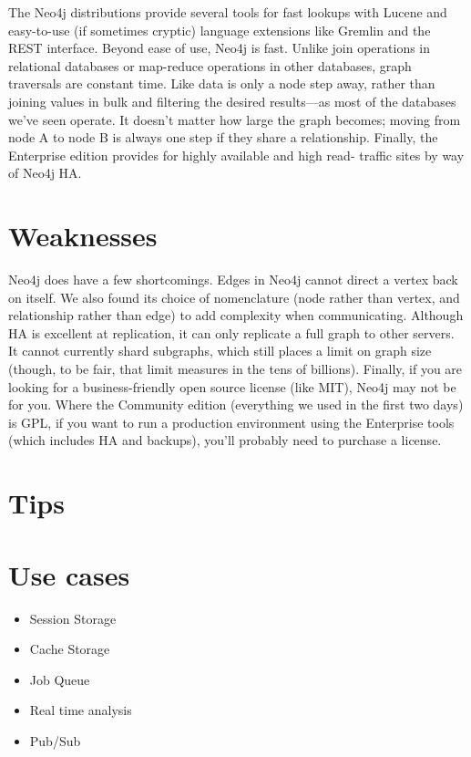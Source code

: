 The Neo4j distributions provide several tools for fast lookups with Lucene and easy-to-use (if sometimes cryptic) language extensions like Gremlin and the REST interface. Beyond ease of use, Neo4j is fast. Unlike join operations in relational databases or map-reduce operations in other databases, graph traversals are constant time. Like data is only a node step away, rather than joining values in bulk and filtering the desired results—as most of the databases we’ve seen operate. It doesn’t matter how large the graph becomes; moving from node A to node B is always one step if they share a relationship. Finally, the Enterprise edition provides for highly available and high read- traffic sites by way of Neo4j HA.\cite{seven_databases}

\section{Weaknesses}

Neo4j does have a few shortcomings. Edges in Neo4j cannot direct a vertex back on itself. We also found its choice of nomenclature (node rather than vertex, and relationship rather than edge) to add complexity when communicating. Although HA is excellent at replication, it can only replicate a full graph to other servers. It cannot currently shard subgraphs, which still places a limit on graph size (though, to be fair, that limit measures in the tens of billions). Finally, if you are looking for a business-friendly open source license (like MIT), Neo4j may not be for you. Where the Community edition (everything we used in the first two days) is GPL, if you want to run a production environment using the Enterprise tools (which includes HA and backups), you’ll probably need to purchase a license.\cite{seven_databases}

\section{Tips}

\section{Use cases}

\begin{itemize}
  \item Session Storage
  \item Cache Storage
  \item Job Queue
  \item Real time analysis
  \item Pub/Sub
\end{itemize}